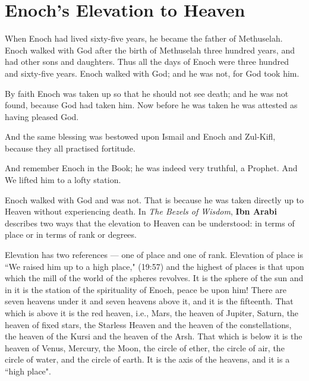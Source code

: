 \section{Enoch's Elevation to Heaven}

\begin{quotex}
When Enoch had lived sixty-five years, he became the father of Methuselah. Enoch walked with God after the birth of Methuselah three hundred years, and had other sons and daughters. Thus all the days of Enoch were three hundred and sixty-five years. Enoch walked with God; and he was not, for God took him. 

By faith Enoch was taken up so that he should not see death; and he was not found, because God had taken him. Now before he was taken he was attested as having pleased God. 

And the same blessing was bestowed upon Ismail and Enoch and Zul-Kifl, because they all practised fortitude. 

And remember Enoch in the Book; he was indeed very truthful, a Prophet. And We lifted him to a lofty station. 

\end{quotex}

Enoch walked with God and was not. That is because he was taken directly up to Heaven without experiencing death. In \emph{The Bezels of Wisdom}, \textbf{Ibn Arabi} describes two ways that the elevation to Heaven can be understood: in terms of place or in terms of rank or degrees.

\begin{quotex}
Elevation has two references — one of place and one of rank. Elevation of place is ``We raised him up to a high place," (19:57) and the highest of places is that upon which the mill of the world of the spheres revolves. It is the sphere of the sun and in it is the station of the spirituality of Enoch, peace be upon him! There are seven heavens under it and seven heavens above it, and it is the fifteenth. That which is above it is the red heaven, i.e., Mars, the heaven of Jupiter, Saturn, the heaven of fixed stars, the Starless Heaven and the heaven of the constellations, the heaven of the Kursi and the heaven of the Arsh. That which is below it is the heaven of Venus, Mercury, the Moon, the circle of ether, the circle of air, the circle of water, and the circle of earth. It is the axis of the heavens, and it is a ``high place".

\end{quotex}

